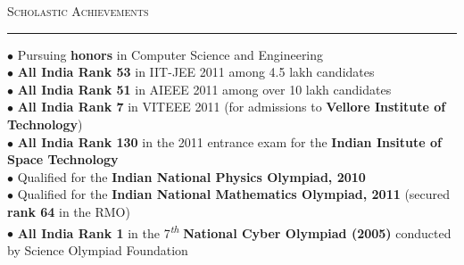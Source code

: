 \documentclass[a4paper,9pt]{article}
\begin{document}
\vspace*{4.6cm}

\normalsize
\small

\Large{\textsc{Scholastic Achievements}}\vspace{1.5pt}
\hrule\vspace{0.25cm}
\small
$\bullet$ Pursuing \textbf{honors} in Computer Science and Engineering\\
$\bullet$ \textbf{All India Rank 53} in IIT-JEE 2011 among 4.5 lakh candidates\\
$\bullet$ \textbf{All India Rank 51} in AIEEE 2011 among over 10 lakh candidates\\
$\bullet$ \textbf{All India Rank 7} in VITEEE 2011 (for admissions to \textbf{Vellore Institute of Technology})\\
$\bullet$ \textbf{All India Rank 130} in the 2011 entrance exam for the \textbf{Indian Insitute of Space Technology}\\
$\bullet$ Qualified for the \textbf{Indian National Physics Olympiad, 2010}\\
$\bullet$ Qualified for the \textbf{Indian National Mathematics Olympiad, 2011} (secured \textbf{rank 64} in the RMO)\\
$\bullet$ \textbf{All India Rank 1} in the 7\textsuperscript{\emph{th}} \textbf{National Cyber Olympiad (2005)} conducted by Science Olympiad Foundation\\
\end{document}

